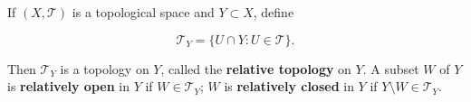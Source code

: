 If $(X, \mathcal{T})$ is a topological space and $Y \subset X$, define

$$\mathcal{T}_Y = \{U \cap Y : U \in \mathcal{T}\}.$$

Then $\mathcal{T}_Y$ is a topology on $Y$, called the \textbf{relative topology} on $Y$. A subset $W$ of $Y$ is \textbf{relatively open} in $Y$ if $W \in \mathcal{T}_Y$; $W$ is \textbf{relatively closed} in $Y$ if $Y \setminus W \in \mathcal{T}_Y$.
